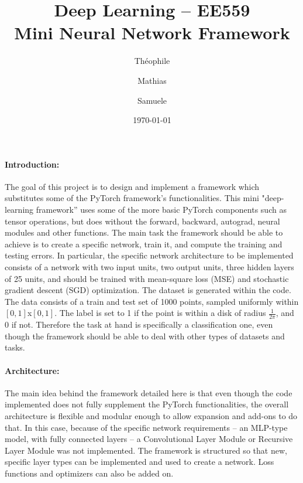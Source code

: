 \documentclass[11pt, a4paper]{article}
\begin{document}
\title{\large{\textbf{Deep Learning -- EE559 \\ Mini Neural Network Framework}}}
\date{\normalsize{\today}}
\author{\normalsize{Th\' eophile 	} \and \normalsize{Mathias } \and \normalsize{Samuele }}
\maketitle

\paragraph{Introduction:} The goal of this project is to design and implement a framework which substitutes some of the PyTorch framework's functionalities. This mini "deep-learning framework” uses some of the more basic PyTorch components such as tensor operations, but does without the forward, backward, autograd, neural modules and other functions. 
The main task the framework should be able to achieve is to create a specific network, train it, and compute the training and testing errors.
In particular, the specific network architecture to be implemented consists of a network with two input units, two output units, three hidden layers of 25 units, and should be trained with mean-square loss (MSE) and stochastic gradient descent (SGD) optimization.
The dataset is generated within the code. The data consists of a train and test set of 1000 points, sampled uniformly within $[0,1]$x$[0,1]$. The label is set to 1 if the point is within a disk of radius $\frac{1}{2\pi}$, and 0 if not. Therefore the task at hand is specifically a classification one, even though the framework should be able to deal with other types of datasets and tasks.
	
\paragraph{Architecture:}The main idea behind the framework detailed here is that even though the code implemented does not fully supplement the PyTorch functionalities, the overall architecture is flexible and modular enough to allow expansion and add-ons to do that. In this case, because of 	the specific network requirements -- an MLP-type model, with fully connected layers -- a Convolutional Layer Module or Recursive Layer Module was not implemented. The framework is structured so that new, specific layer types can be implemented and used to create a network. Loss functions and optimizers can also be added on.
\end{document}
